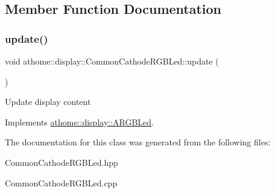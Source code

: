 \subsection{Member Function Documentation}
\mbox{\label{classathome_1_1display_1_1_common_cathode_r_g_b_led_ab78ab6aef619d8e0941dd11d4cfbb545}} 
\subsubsection{\texorpdfstring{update()}{update()}}
{\footnotesize\ttfamily void athome\+::display\+::\+Common\+Cathode\+R\+G\+B\+Led\+::update (\begin{DoxyParamCaption}{ }\end{DoxyParamCaption})\hspace{0.3cm}{\ttfamily [virtual]}}

Update display content 

Implements \mbox{\hyperlink{classathome_1_1display_1_1_a_r_g_b_led_a725ceca0c01735daa9c95148baf075ab}{athome\+::display\+::\+A\+R\+G\+B\+Led}}.



The documentation for this class was generated from the following files\+:\begin{DoxyCompactItemize}
\item 
Common\+Cathode\+R\+G\+B\+Led.\+hpp\item 
Common\+Cathode\+R\+G\+B\+Led.\+cpp\end{DoxyCompactItemize}
